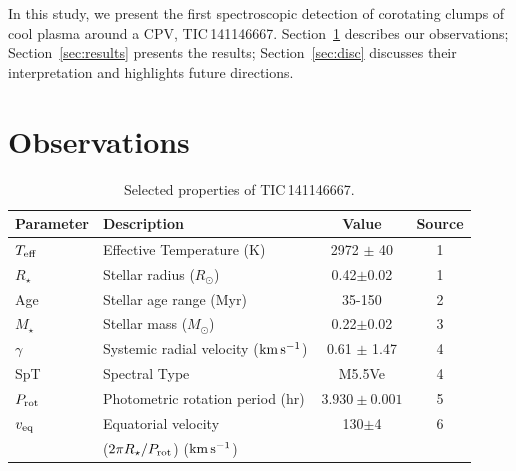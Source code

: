 \documentclass[11pt,twocolumn,tighten,linenumbers]{aastex7}
\newcommand{\kms}{\ensuremath{\rm km\,s^{-1}}}
\begin{document}
In this study, we present the first spectroscopic detection of
corotating clumps of cool plasma around a CPV, TIC\,141146667.
Section~\ref{sec:obs} describes our observations;
Section~\ref{sec:results} presents the results; Section~\ref{sec:disc}
discusses their interpretation and highlights future directions.


\section{Observations}
\label{sec:obs}

\begin{table}
\small
\setlength{\tabcolsep}{2pt}
\centering
  \caption{Selected properties of TIC\,141146667.}
\vspace{-0.2cm}
\label{tab:params}
\begin{tabular}{llcc}
\hline \hline
Parameter & Description & Value & Source\\
\hline 
%
$T_{\rm eff}$\dotfill                   & Effective Temperature (K) \hspace{9pt}\dotfill                 & 2972 $\pm$ 40    & 1 \\
%
$R_\star$\dotfill                       & Stellar radius ($R_\odot$)\dotfill                             & 0.42$\pm$0.02    & 1 \\
%
Age                                     & Stellar age range (Myr)\dotfill                                & 35-150           & 2 \\
%
$M_\star$\dotfill                       & Stellar mass ($M_\odot$)\dotfill                               & 0.22$\pm$0.02    & 3 \\
%
$\gamma$\dotfill                        & Systemic radial velocity (\kms)\dotfill                        & 0.61 $\pm$ 1.47  & 4 \\
%
SpT\dotfill                             & Spectral Type\dotfill                                          & M5.5Ve           & 4 \\
%
$P_{\rm rot}$\dotfill                   & Photometric rotation period (hr)\dotfill                       & $3.930\pm 0.001$ & 5 \\
%
$v_{\rm eq}$\dotfill		                & Equatorial velocity \dotfill                                   &  130$\pm$4       & 6 \\
                                        & \hspace{3pt} ($2\pi R_\star/P_{\rm rot}$) (\kms)	             &                      \\

\end{tabular}
\end{table}
\end{document}
